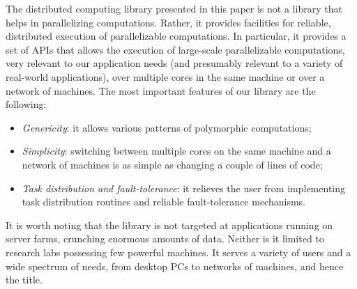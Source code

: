 \documentclass[a4paper,12pt]{article}
\begin{document}
The distributed computing library presented in this paper is not a
library that helps in parallelizing computations. Rather, it provides
facilities for reliable, distributed execution of parallelizable
computations. In particular, it provides a set of APIs that allows the
execution of large-scale parallelizable computations, very relevant to
our application needs (and presumably relevant to a variety of
real-world applications), over multiple cores in the same machine or
over a network of machines. 
The most important features of our library are the following:
\begin{itemize}
\item \emph{Genericity}: 
  it allows various patterns of polymorphic computations;
\item \emph{Simplicity}: switching between multiple cores on the same
  machine and a network of machines is as simple as changing a couple
  of lines of code;
\item \emph{Task distribution and fault-tolerance}: 
  it relieves the user from implementing task distribution routines
  and reliable fault-tolerance mechanisms.
\end{itemize}
It is worth noting that the library is not targeted at applications
running on server farms, crunching enormous amounts of data. Neither
is it limited to research labs possessing few powerful
machines. It serves a variety of users and a wide
spectrum of needs, from desktop PCs to networks of machines, and hence
the title.
\end{document}
